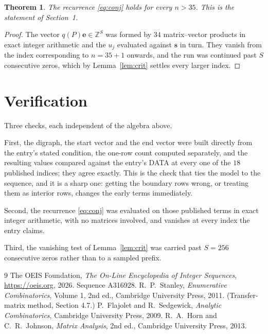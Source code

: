 \documentclass[11pt,a4paper]{article}
\theoremstyle{plain}
\newtheorem{theorem}{Theorem}
\theoremstyle{definition}
\begin{document}
\begin{theorem}
The recurrence \eqref{eq:conj} holds for every $n>35$. This is the statement of
Section~1.
\end{theorem}

\begin{proof}
The vector $q(P)\mathbf{e}\in\mathbb{Z}^{S}$ was formed by $34$ matrix--vector
products in exact integer arithmetic and the $u_j$ evaluated against $\mathbf{s}$ in turn.
They vanish from the index corresponding to $n=35+1$ onwards, and the run was continued
past $S$ consecutive zeros, which by Lemma~\ref{lem:crit} settles every larger index.
\end{proof}

\section{Verification}

Three checks, each independent of the algebra above.

First, the digraph, the start vector and the end vector were built directly from the
entry's stated condition, the one-row count computed separately, and the resulting values
compared against the entry's DATA at every one of the $18$ published indices; they
agree exactly. This is the check that ties the model to the sequence, and it is a sharp one:
getting the boundary rows wrong, or treating them as interior rows, changes the early terms
immediately.

Second, the recurrence \eqref{eq:conj} was evaluated on those published terms in exact
integer arithmetic, with no matrices involved, and vanishes at every index the entry claims.

Third, the vanishing test of Lemma~\ref{lem:crit} was carried past $S=256$ consecutive
zeros rather than to a sampled prefix.

\begin{thebibliography}{9}
 The OEIS Foundation, \emph{The On-Line Encyclopedia of Integer
Sequences}, \url{https://oeis.org}, 2026. Sequence A316928.
 R.~P.~Stanley, \emph{Enumerative Combinatorics}, Volume 1, 2nd ed.,
Cambridge University Press, 2011. (Transfer-matrix method, Section 4.7.)
 P.~Flajolet and R.~Sedgewick, \emph{Analytic Combinatorics}, Cambridge
University Press, 2009.
 R.~A.~Horn and C.~R.~Johnson, \emph{Matrix Analysis}, 2nd ed., Cambridge
University Press, 2013.
\end{thebibliography}
\end{document}
